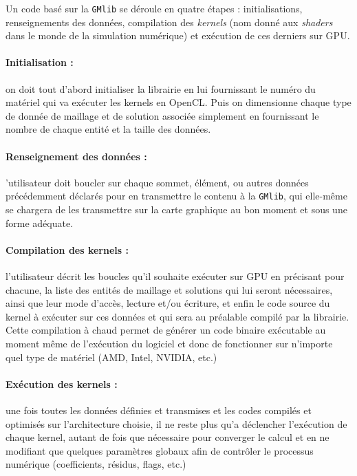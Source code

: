 \documentclass[a4paper,12pt]{article}
\begin{document}
Un code basé sur la {\tt GMlib} se déroule en quatre étapes : initialisations, renseignements des données, compilation des \emph{kernels} (nom donné aux \emph{shaders} dans le monde de la simulation numérique) et exécution de ces derniers sur GPU.

\paragraph{Initialisation :} on doit tout d'abord initialiser la librairie en lui fournissant le numéro du matériel qui va exécuter les kernels en OpenCL. Puis on dimensionne chaque type de donnée de maillage et de solution associée simplement en fournissant le nombre de chaque entité et la taille des données.

\paragraph{Renseignement des données :} 'utilisateur doit boucler sur chaque sommet, élément, ou autres données précédemment déclarés pour en transmettre le contenu à la {\tt GMlib}, qui elle-même se chargera de les transmettre sur la carte graphique au bon moment et sous une forme adéquate.

\paragraph{Compilation des kernels :} l'utilisateur décrit les boucles qu'il souhaite exécuter sur GPU en précisant pour chacune, la liste des entités de maillage et solutions qui lui seront nécessaires, ainsi que leur mode d'accès, lecture et/ou écriture, et enfin le code source du kernel à exécuter sur ces données et qui sera au préalable compilé par la librairie.
Cette compilation à chaud permet de générer un code binaire exécutable au moment même de l'exécution du logiciel et donc de fonctionner sur n'importe quel type de matériel (AMD, Intel, NVIDIA, etc.)

\paragraph{Exécution des kernels :} une fois toutes les données définies et transmises et les codes compilés et optimisés sur l'architecture choisie, il ne reste plus qu'a déclencher l'exécution de chaque kernel, autant de fois que nécessaire pour converger le calcul et en ne modifiant que quelques paramètres globaux afin de contrôler le processus numérique (coefficients, résidus, flags, etc.)
\end{document}
